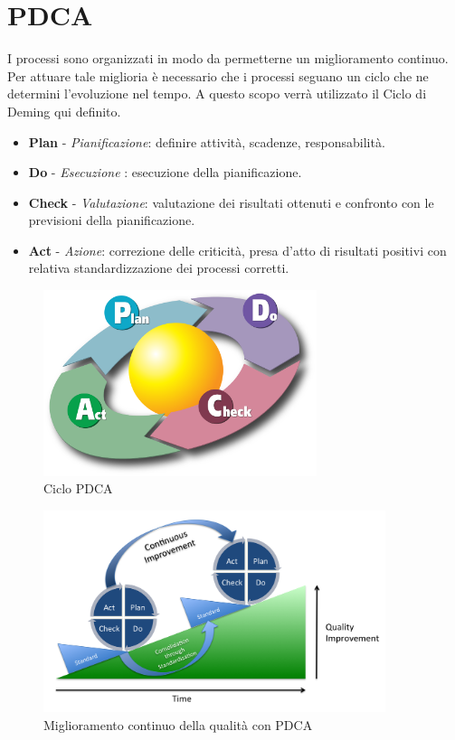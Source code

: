 \section{PDCA}\label{app:pdca}
I processi sono organizzati in modo da permetterne un miglioramento continuo.\\
Per attuare tale miglioria è necessario che i processi seguano un ciclo che ne determini l'evoluzione nel tempo.
A questo scopo verrà utilizzato il Ciclo di Deming qui definito.
\begin{itemize}
	\item \textbf{Plan} - \textit{Pianificazione}: definire attività, scadenze, responsabilità.
	\item \textbf{Do} - \textit{Esecuzione} : esecuzione della pianificazione.
	\item \textbf{Check} - \textit{Valutazione}: valutazione dei risultati ottenuti e confronto con le previsioni della pianificazione. 
	\item \textbf{Act} - \textit{Azione}: correzione delle criticità, presa d’atto di risultati positivi con relativa standardizzazione dei processi corretti.
\end{itemize}
%	
\begin{figure}[H]	
	\centering
	\includegraphics[width=8cm]{PDCA.png}
	\caption{Ciclo PDCA}
\end{figure}
\begin{figure}[H]
	\centering
	\includegraphics[width=10cm]{PDCAProcess}
	\caption{Miglioramento continuo della qualità con PDCA}
\end{figure}